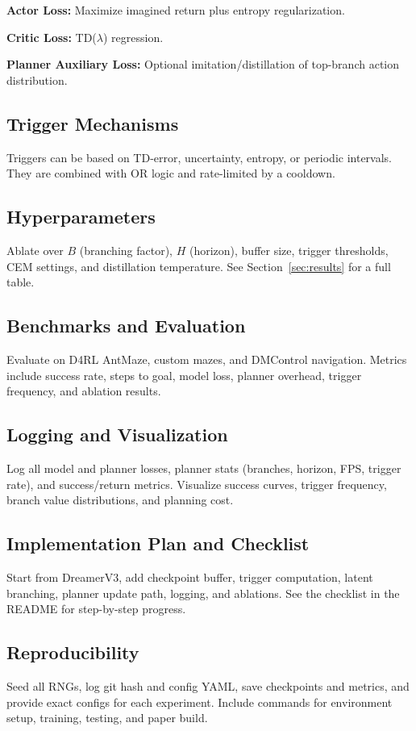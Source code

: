 \documentclass{article}
\begin{document}
\textbf{Actor Loss:} Maximize imagined return plus entropy regularization.

\textbf{Critic Loss:} TD($\lambda$) regression.

\textbf{Planner Auxiliary Loss:} Optional imitation/distillation of top-branch action distribution.

\subsection{Trigger Mechanisms}
Triggers can be based on TD-error, uncertainty, entropy, or periodic intervals. They are combined with OR logic and rate-limited by a cooldown.

\subsection{Hyperparameters}
Ablate over $B$ (branching factor), $H$ (horizon), buffer size, trigger thresholds, CEM settings, and distillation temperature. See Section~\ref{sec:results} for a full table.

\subsection{Benchmarks and Evaluation}
Evaluate on D4RL AntMaze, custom mazes, and DMControl navigation. Metrics include success rate, steps to goal, model loss, planner overhead, trigger frequency, and ablation results.

\subsection{Logging and Visualization}
Log all model and planner losses, planner stats (branches, horizon, FPS, trigger rate), and success/return metrics. Visualize success curves, trigger frequency, branch value distributions, and planning cost.

\subsection{Implementation Plan and Checklist}
Start from DreamerV3, add checkpoint buffer, trigger computation, latent branching, planner update path, logging, and ablations. See the checklist in the README for step-by-step progress.

\subsection{Reproducibility}
Seed all RNGs, log git hash and config YAML, save checkpoints and metrics, and provide exact configs for each experiment. Include commands for environment setup, training, testing, and paper build.
\end{document}
